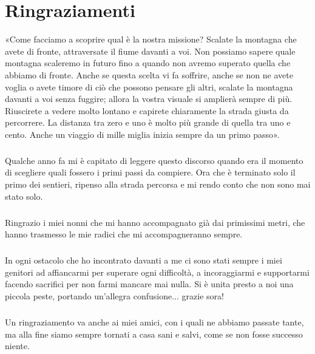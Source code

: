 \chapter{Ringraziamenti}

«Come facciamo a scoprire qual è la nostra missione?
Scalate la montagna che avete di fronte, attraversate il fiume davanti a voi.
Non possiamo sapere quale montagna scaleremo in futuro fino a quando non avremo superato quella che abbiamo di fronte.
Anche se questa	scelta vi fa soffrire, anche se non ne avete voglia o avete timore di ciò che possono pensare gli altri, scalate la montagna davanti a voi senza fuggire;
allora la vostra visuale si amplierà sempre di più.
Riuscirete a vedere molto lontano e capirete chiaramente la strada giusta da percorrere.
La distanza tra zero e uno è molto più grande di quella tra uno e cento.
Anche un viaggio di mille miglia inizia sempre da un primo passo».

\paragraph{}
Qualche anno fa mi è capitato di leggere questo discorso quando era il momento di scegliere quali fossero i primi passi da compiere. Ora che è terminato solo il primo dei sentieri, ripenso alla strada percorsa e mi rendo conto che non sono mai stato solo.

\paragraph{}
Ringrazio i miei nonni che mi hanno accompagnato già dai primissimi metri, che hanno trasmesso le mie radici che mi accompagneranno sempre.

\paragraph{}
In ogni ostacolo che ho incontrato davanti a me ci sono stati sempre i miei genitori ad affiancarmi per superare ogni difficoltà, a incoraggiarmi e supportarmi facendo sacrifici per non farmi mancare mai nulla. Si è unita presto a noi una piccola peste, portando un'allegra confusione... grazie sora!

\paragraph{}
Un ringraziamento va anche ai miei amici, con i quali ne abbiamo passate tante, ma alla fine siamo sempre tornati a casa sani e salvi, come se non fosse successo niente.

